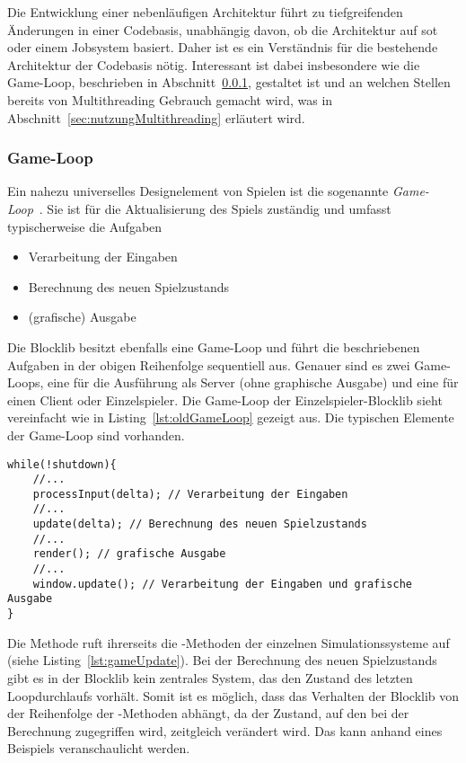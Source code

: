 Die Entwicklung einer nebenläufigen Architektur führt zu
 tiefgreifenden Änderungen in einer Codebasis, unabhängig davon, ob die Architektur auf \ac{sot} oder einem Jobsystem basiert. Daher ist es ein Verständnis für die bestehende Architektur der Codebasis nötig. Interessant ist dabei insbesondere wie die Game-Loop, beschrieben in Abschnitt~\ref{sec:gameLoop}, gestaltet ist und an welchen Stellen bereits von Multithreading Gebrauch gemacht wird, was in Abschnitt~\ref{sec:nutzungMultithreading} erläutert wird.

\subsubsection{Game-Loop}\label{sec:gameLoop}
Ein nahezu universelles Designelement von Spielen ist die sogenannte \emph{Game-Loop}~\cite[S.~161~ff.]{Nystrom2015}. Sie ist für die Aktualisierung des Spiels zuständig und umfasst typischerweise die Aufgaben 
\begin{itemize}
  \item Verarbeitung der Eingaben
  \item Berechnung des neuen Spielzustands
  \item (grafische) Ausgabe
\end{itemize}
Die Blocklib besitzt ebenfalls eine Game-Loop und führt die beschriebenen Aufgaben in der obigen Reihenfolge sequentiell aus. Genauer sind es zwei Game-Loops, eine für die Ausführung als Server (ohne graphische Ausgabe) und eine für einen Client oder Einzelspieler. Die Game-Loop der Einzelspieler-Blocklib sieht vereinfacht wie in Listing~\ref{lst:oldGameLoop} gezeigt aus. Die typischen Elemente der Game-Loop sind vorhanden.

\begin{lstlisting}[caption={Vereinfachte Version der Blocklib für Einzelspieler.},label={lst:oldGameLoop},float={htbp}]
while(!shutdown){
	//...
	processInput(delta); // Verarbeitung der Eingaben
	//...
	update(delta); // Berechnung des neuen Spielzustands
	//...
	render(); // grafische Ausgabe
	//...
	window.update(); // Verarbeitung der Eingaben und grafische Ausgabe
}
\end{lstlisting}

Die Methode  ruft ihrerseits die -Methoden der einzelnen Simulationssysteme auf (siehe Listing~\ref{lst:gameUpdate}).
Bei der Berechnung des neuen Spielzustands gibt es in der Blocklib kein zentrales System, das den Zustand des letzten Loopdurchlaufs vorhält. Somit ist es möglich, dass das Verhalten der Blocklib von der Reihenfolge der -Methoden abhängt, da der Zustand, auf den bei der Berechnung zugegriffen wird, zeitgleich verändert wird. Das kann anhand eines Beispiels veranschaulicht werden. 

